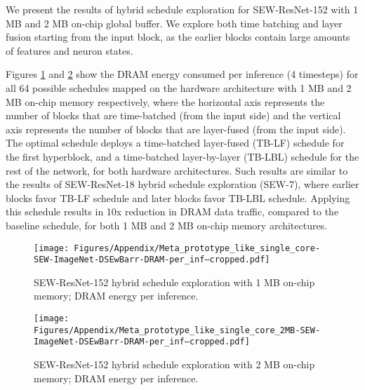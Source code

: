 We present the results of hybrid schedule exploration for SEW-ResNet-152 with 1 MB and 2 MB on-chip global buffer. We explore both time batching and layer fusion starting from the input block, as the earlier blocks contain large amounts of features and neuron states.

Figures \ref{fig:sew152-1} and \ref{fig:sew152-2} show the DRAM energy consumed per inference (4 timesteps) for all 64 possible schedules mapped on the hardware architecture with 1 MB and 2 MB on-chip memory respectively, where the horizontal axis represents the number of blocks that are time-batched (from the input side) and the vertical axis represents the number of blocks that are layer-fused (from the input side). The optimal schedule deploys a time-batched layer-fused (TB-LF) schedule for the first hyperblock, and a time-batched layer-by-layer (TB-LBL) schedule for the rest of the network, for both hardware architectures. Such results are similar to the results of SEW-ResNet-18 hybrid schedule exploration (SEW-7), where earlier blocks favor TB-LF schedule and later blocks favor TB-LBL schedule. Applying this schedule results in 10x reduction in DRAM data traffic, compared to the baseline schedule, for both 1 MB and 2 MB on-chip memory architectures.

\begin{figure}[t]
    \centering
    \texttt{[image: Figures/Appendix/Meta\_prototype\_like\_single\_core-SEW-ImageNet-DSEwBarr-DRAM-per\_inf--cropped.pdf]}
    \caption{SEW-ResNet-152 hybrid schedule exploration with 1 MB on-chip memory; DRAM energy per inference.}
    \label{fig:sew152-1}
\end{figure}



\begin{figure}[t]
    \centering
    \texttt{[image: Figures/Appendix/Meta\_prototype\_like\_single\_core\_2MB-SEW-ImageNet-DSEwBarr-DRAM-per\_inf--cropped.pdf]}
    \caption{SEW-ResNet-152 hybrid schedule exploration with 2 MB on-chip memory; DRAM energy per inference.}
    \label{fig:sew152-2}
\end{figure}






















